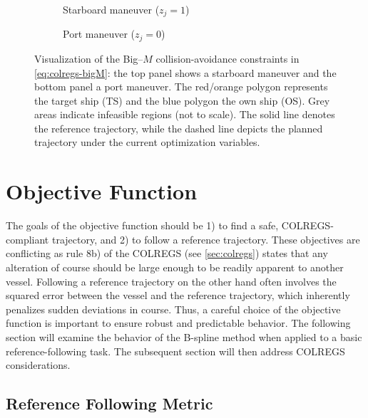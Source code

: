 \begin{figure}[htbp]
    \centering
    \begin{subfigure}[t]{.8\textwidth}
        \centering
        
        \caption{Starboard maneuver ($z_j=1$)}
        \label{fig:non-convex-obstacle-mi-sb}
    \end{subfigure}
    \begin{subfigure}[t]{.8\textwidth}
        \centering
        
        \caption{Port maneuver ($z_j=0$)}
        \label{fig:non-convex-obstacle-mi-port}
    \end{subfigure}
    \caption{Visualization of the Big–$M$ collision-avoidance constraints in \cref{eq:colregs-bigM}: the top panel shows a starboard maneuver and the bottom panel a port maneuver. The red/orange polygon represents the target ship (TS) and the blue polygon the own ship (\acrshort{OS}). Grey areas indicate infeasible regions (not to scale). The solid line denotes the reference trajectory, while the dashed line depicts the planned trajectory under the current optimization variables.}
    \label{fig:non-convex-obstacle-mi}
\end{figure}



\section{Objective Function}
The goals of the objective function should be 1) to find a safe, COLREGS-compliant trajectory, and 2) to follow a reference trajectory. These objectives are conflicting as rule 8b) of the COLREGS (see \cref{sec:colregs}) states that any alteration of course should be large enough to be readily apparent to another vessel. Following a reference trajectory on the other hand often involves the squared error between the vessel and the reference trajectory, which inherently penalizes sudden deviations in course. 
Thus, a careful choice of the objective function is important to ensure robust and predictable behavior. 
The following section will examine the behavior of the B-spline method when applied to a basic reference-following task. The subsequent section will then address COLREGS considerations.


\subsection{Reference Following Metric}
\label{sec:reference-following-metric}

